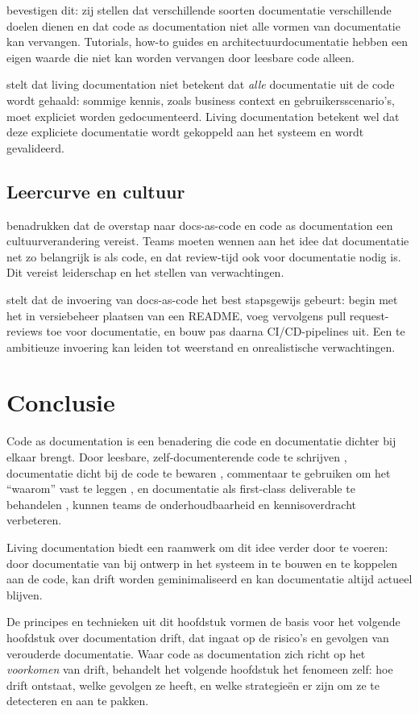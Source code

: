 \textcite{bhatti2021docsdevelopers} bevestigen dit: zij stellen dat verschillende soorten documentatie verschillende doelen dienen en dat code as documentation niet alle vormen van documentatie kan vervangen. Tutorials, how-to guides en architectuurdocumentatie hebben een eigen waarde die niet kan worden vervangen door leesbare code alleen.

\textcite{martraire2019livingdocumentation} stelt dat living documentation niet betekent dat \textit{alle} documentatie uit de code wordt gehaald: sommige kennis, zoals business context en gebruikersscenario's, moet expliciet worden gedocumenteerd. Living documentation betekent wel dat deze expliciete documentatie wordt gekoppeld aan het systeem en wordt gevalideerd.

\subsection{Leercurve en cultuur}
\textcite{bhatti2021docsdevelopers} benadrukken dat de overstap naar docs-as-code en code as documentation een cultuurverandering vereist. Teams moeten wennen aan het idee dat documentatie net zo belangrijk is als code, en dat review-tijd ook voor documentatie nodig is. Dit vereist leiderschap en het stellen van verwachtingen.

\textcite{gentle2017docslikecode} stelt dat de invoering van docs-as-code het best stapsgewijs gebeurt: begin met het in versiebeheer plaatsen van een README, voeg vervolgens pull request-reviews toe voor documentatie, en bouw pas daarna CI/CD-pipelines uit. Een te ambitieuze invoering kan leiden tot weerstand en onrealistische verwachtingen.

\section{Conclusie}
\label{sec:cad-conclusie}

Code as documentation is een benadering die code en documentatie dichter bij elkaar brengt. Door leesbare, zelf-documenterende code te schrijven \autocite{boswell2011readablecode}, documentatie dicht bij de code te bewaren \autocite{gentle2017docslikecode}, commentaar te gebruiken om het ``waarom'' vast te leggen \autocite{ousterhout2018philosophy}, en documentatie als first-class deliverable te behandelen \autocite{etter2016moderntechwriting}, kunnen teams de onderhoudbaarheid en kennisoverdracht verbeteren.

Living documentation \autocite{martraire2019livingdocumentation} biedt een raamwerk om dit idee verder door te voeren: door documentatie van bij ontwerp in het systeem in te bouwen en te koppelen aan de code, kan drift worden geminimaliseerd en kan documentatie altijd actueel blijven.

De principes en technieken uit dit hoofdstuk vormen de basis voor het volgende hoofdstuk over documentation drift, dat ingaat op de risico's en gevolgen van verouderde documentatie. Waar code as documentation zich richt op het \textit{voorkomen} van drift, behandelt het volgende hoofdstuk het fenomeen zelf: hoe drift ontstaat, welke gevolgen ze heeft, en welke strategieën er zijn om ze te detecteren en aan te pakken.

